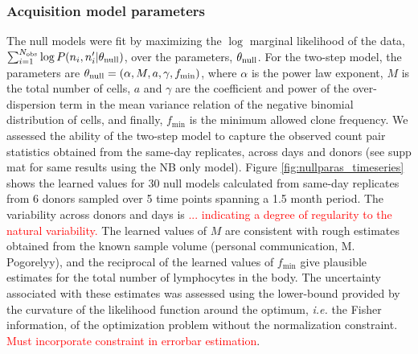 \documentclass[letterpaper,english,prl,reprint,longbibliography]{revtex4-1} %
\newcommand{\re}[1]{\textcolor{red}{#1}}
\begin{document}
\subsubsection*{Acquisition model parameters}
The null models were fit by maximizing the $\log$ marginal likelihood of the data, $\sum_{i=1}^{N_{\textrm{\textrm{obs}}}} \log P(n_i,n'_i|\theta_{\text{\textrm{null}}})$, over the parameters, $\theta_{\text{\textrm{null}}}$. 
For the two-step model, the parameters are $\theta_{\text{\textrm{null}}}=(\alpha,M,a,\gamma,f_{\textrm{min}})$, where $\alpha$ is the power law exponent, $M$ is the total number of cells, $a$ and $\gamma$ are the coefficient and power of the over-dispersion term in the mean variance relation of the negative binomial distribution of cells, and finally, $f_{\textrm{min}}$ is the minimum allowed clone frequency.
We assessed the ability of the two-step model to capture the observed count pair statistics obtained from the same-day replicates, across days and donors (see supp mat for same results using the NB only model). 
Figure \ref{fig:nullparas_timeseries} shows the learned values for 30 null models calculated from same-day replicates from 6 donors sampled over 5 time points spanning a 1.5 month period. 
The variability across donors and days is \textcolor{red}{... indicating a degree of regularity to the natural variability.} 
The learned values of $M$ are consistent with rough estimates obtained from the known sample volume (personal communication, M. Pogorelyy), and the reciprocal of the learned values of $f_{\textrm{min}}$ give plausible estimates for the total number of lymphocytes in the body.
The uncertainty associated with these estimates was assessed using the lower-bound provided by the curvature of the likelihood function around the optimum, \emph{i.e.} the Fisher information, of the optimization problem without the normalization constraint. \re{Must incorporate constraint in errorbar estimation}.
\end{document}
